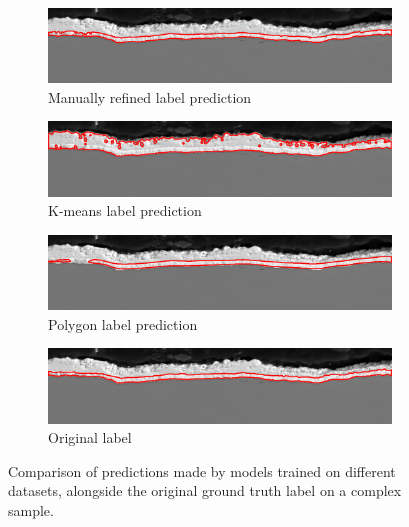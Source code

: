 \begin{figure}[H]
    \centering
    \begin{subfigure}[b]{0.75\linewidth}
        \centering
        \includegraphics[width=\linewidth]{PICTURES/eval/188_kmeans_refined.png}
        \caption{Manually refined label prediction}
        \label{fig:kmeans-refined}
    \end{subfigure}
    
    \vspace{0.5cm}
    
    \begin{subfigure}[b]{0.75\linewidth}
        \centering
        \includegraphics[width=\linewidth]{PICTURES/eval/188_kmeans.png}
        \caption{K-means label prediction}
        \label{fig:kmeans}
    \end{subfigure}

    \vspace{0.5cm}
    
    \begin{subfigure}[b]{0.75\linewidth}
        \centering
        \includegraphics[width=\linewidth]{PICTURES/eval/188_polygon.png}
        \caption{Polygon label prediction}
        \label{fig:polygon}
    \end{subfigure}
    
    \vspace{0.5cm}
    
    \begin{subfigure}[b]{0.75\linewidth}
        \centering
        \includegraphics[width=\linewidth]{PICTURES/eval/188_og.png}
        \caption{Original label}
        \label{fig:ground-truth}
    \end{subfigure}
    
    \caption{Comparison of predictions made by models trained on different datasets, alongside the original ground truth label on a complex sample.}
    \label{fig:comparison}
\end{figure}
